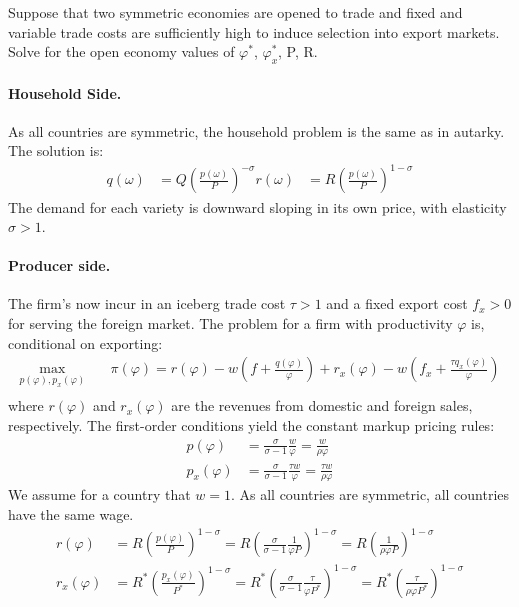 Suppose that two symmetric economies are opened to trade and fixed and variable trade costs are
sufficiently high to induce selection into export markets. Solve for the open economy values of $\varphi^*$, $\varphi^*_x$, P, R.

\begin{solution}
	\paragraph{Household Side.} As all countries are symmetric, the household problem is the same as in autarky. The solution is:
	\begin{align*}
		q(\omega) &= Q \left( \frac{p(\omega)}{P} \right)^{-\sigma}
		r(\omega) &= R \left( \frac{p(\omega)}{P} \right)^{1 - \sigma}
	\end{align*}
	The demand for each variety is downward sloping in its own price, with elasticity $\sigma>1$.
	\paragraph{Producer side.} The firm's now incur in an iceberg trade cost $\tau>1$ and a fixed export cost $f_x>0$ for serving the foreign market. The problem for a firm with productivity $\varphi$ is, conditional on exporting:
	\begin{align*}
		\max_{p(\varphi), p_x(\varphi)} \quad & \pi(\varphi) = r(\varphi) - w \left( f + \frac{q(\varphi)}{\varphi} \right) + r_x(\varphi) - w \left( f_x + \frac{\tau q_x(\varphi)}{\varphi} \right) \\
	\end{align*}
	where $r(\varphi)$ and $r_x(\varphi)$ are the revenues from domestic and foreign sales, respectively. The first-order conditions yield the constant markup pricing rules:
	\begin{align*}
		p(\varphi) &= \frac{\sigma}{\sigma - 1} \frac{w}{\varphi} = \frac{w}{\rho \varphi} \\
		p_x(\varphi) &= \frac{\sigma}{\sigma - 1} \frac{\tau w}{\varphi} = \frac{\tau w}{\rho \varphi}
	\end{align*}
	We assume for a country that $w=1$. As all countries are symmetric, all countries have the same wage.
	\begin{align*}
		r(\varphi) &= R \left( \frac{p(\varphi)}{P} \right)^{1 - \sigma} = R \left( \frac{\sigma}{\sigma - 1} \frac{1}{\varphi P} \right)^{1 - \sigma} = R \left( \frac{1}{\rho \varphi P} \right)^{1 - \sigma} \\
		r_x(\varphi) &= R^* \left( \frac{p_x(\varphi)}{P^*} \right)^{1 - \sigma} = R^* \left( \frac{\sigma}{\sigma - 1} \frac{\tau}{\varphi P^*} \right)^{1 - \sigma} = R^* \left( \frac{\tau}{\rho \varphi P^*} \right)^{1 - \sigma}
	\end{align*}
\end{solution}